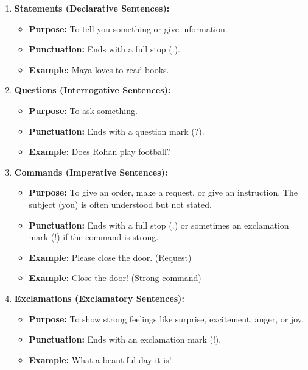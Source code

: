 \begin{enumerate}
    \item \textbf{Statements (Declarative Sentences):}
    \begin{itemize}
        \item \textbf{Purpose:} To tell you something or give information.
        \item \textbf{Punctuation:} Ends with a full stop (.).
        \item \textbf{Example:} Maya loves to read books.
    \end{itemize}

    \item \textbf{Questions (Interrogative Sentences):}
    \begin{itemize}
        \item \textbf{Purpose:} To ask something.
        \item \textbf{Punctuation:} Ends with a question mark (?).
        \item \textbf{Example:} Does Rohan play football?
    \end{itemize}

    \item \textbf{Commands (Imperative Sentences):}
    \begin{itemize}
        \item \textbf{Purpose:} To give an order, make a request, or give an instruction. The subject (you) is often understood but not stated.
        \item \textbf{Punctuation:} Ends with a full stop (.) or sometimes an exclamation mark (!) if the command is strong.
        \item \textbf{Example:} Please close the door. (Request)
        \item \textbf{Example:} Close the door! (Strong command)
    \end{itemize}

    \item \textbf{Exclamations (Exclamatory Sentences):}
    \begin{itemize}
        \item \textbf{Purpose:} To show strong feelings like surprise, excitement, anger, or joy.
        \item \textbf{Punctuation:} Ends with an exclamation mark (!).
        \item \textbf{Example:} What a beautiful day it is!
    \end{itemize}
\end{enumerate}

